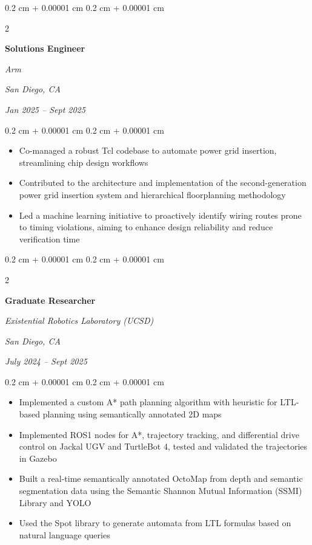 \documentclass[10pt, letterpaper]{article}
\newenvironment{highlights}{
    \begin{itemize}[
        topsep=0.10 cm,
        parsep=0.10 cm,
        partopsep=0pt,
        itemsep=0pt,
        leftmargin=0.4 cm + 10pt
    ]
}{
    \end{itemize}
} %
\newenvironment{onecolentry}{
    \begin{adjustwidth}{
        0.2 cm + 0.00001 cm
    }{
        0.2 cm + 0.00001 cm
    }
}{
    \end{adjustwidth}
} %
\newenvironment{twocolentry}[2][]{
    \needspace{5\baselineskip}%
    \onecolentry
    \def\secondColumn{#2}
    \setcolumnwidth{\fill, 4.5 cm}
    \begin{paracol}{2}
}{
    \switchcolumn \raggedleft \secondColumn
    \end{paracol}
    \endonecolentry
} %
\begin{document}
        \vspace{0.2 cm}

    \begin{twocolentry}{
    \textit{San Diego, CA}    
        
    \textit{Jan 2025 – Sept 2025}}
    \textbf{Solutions Engineer}
    
    \textit{Arm}
\end{twocolentry}

\vspace{0.10 cm}
\begin{onecolentry}
    \begin{highlights}
        \item Co-managed a robust Tcl codebase to automate power grid insertion, streamlining chip design workflows
        \item Contributed to the architecture and implementation of the second-generation power grid insertion system and hierarchical floorplanning methodology
        \item Led a machine learning initiative to proactively identify wiring routes prone to timing violations, aiming to enhance design reliability and reduce verification time
    \end{highlights}
\end{onecolentry}


        \vspace{0.2 cm}

        \begin{twocolentry}{
        \textit{San Diego, CA}    
            
        \textit{July 2024 – Sept 2025}}
            \textbf{Graduate Researcher}
            
            \textit{Existential Robotics Laboratory (UCSD)}
        \end{twocolentry}

        \vspace{0.10 cm}
        \begin{onecolentry}
            \begin{highlights}
                \item Implemented a custom A* path planning algorithm with heuristic for LTL-based planning using semantically annotated 2D maps
                \item Implemented ROS1 nodes for A*, trajectory tracking, and differential drive control on Jackal UGV and TurtleBot 4, tested and validated the trajectories in Gazebo
                \item Built a real-time semantically annotated OctoMap from depth and semantic segmentation data using the Semantic Shannon Mutual Information (SSMI) Library and YOLO
                \item Used the Spot library to generate automata from LTL formulas based on natural language queries
            \end{highlights}
        \end{onecolentry}
\end{document}

